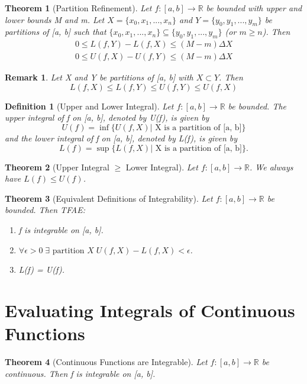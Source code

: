 \documentclass[11pt, oneside]{book}
\theoremstyle{break}
\newtheorem{thm}{Theorem}[section]
\newtheorem*{remark}{Remark}
\newtheorem{defn}{Definition}[section]
\newcommand{\bb}[1]{\mathbb{#1}}		%
\begin{document}
\begin{thm}[Partition Refinement]
	Let $f: [a, b] \to \bb{R}$ be bounded with upper and lower bounds M and m. Let $X = \{x_0, x_1, ..., x_n\}$ and $Y = \{y_0, y_1, ..., y_m\}$ be partitions of [a, b] such that $\{x_0, x_1, ..., x_n\} \subseteq \{y_0, y_1, ..., y_m\}$ (or $m \geq n$). Then
	\begin{gather*}
		0 \leq L(f, Y) - L(f, X) \leq (M - m) \Delta X \\
		0 \leq U(f, X) - U(f, Y) \leq (M - m) \Delta X
	\end{gather*}
\end{thm}

\begin{remark}
	Let X and Y be partitions of [a, b] with $X \subset Y$. Then
	\[
		L(f, X) \leq L(f, Y) \leq U(f, Y) \leq U(f, X)
	\]
\end{remark}

\begin{defn}[Upper and Lower Integral]
	Let $f: [a, b] \to \bb{R}$ be bounded. The upper integral of f on [a, b], denoted by U(f), is given by
	\[
		U(f) = \inf \{U(f, X) | \text{ X is a partition of [a, b]} \}
	\]
	and the lower integral of f on [a, b], denoted by L(f), is given by
	\[
		L(f) = \sup \{L(f, X) | \text{ X is a partition of [a, b]} \}.
	\]
\end{defn}

\begin{thm}[Upper Integral $\geq$ Lower Integral]
	Let $f: [a, b] \to \bb{R}$. We always have $L(f) \leq U(f)$.
\end{thm}

\begin{thm}[Equivalent Definitions of Integrability]
	Let $f: [a, b] \to \bb{R}$ be bounded. Then TFAE:
	\begin{enumerate}
		\item f is integrable on [a, b].
		\item $\forall \epsilon > 0 \; \exists \text{ partition } X \; U(f, X) - L(f, X) < \epsilon$.
		\item L(f) = U(f).
	\end{enumerate}
\end{thm}


\section{Evaluating Integrals of Continuous Functions}

\begin{thm}[Continuous Functions are Integrable]
	Let $f: [a, b] \to \bb{R}$ be continuous. Then f is integrable on [a, b].
\end{thm}
\end{document}
